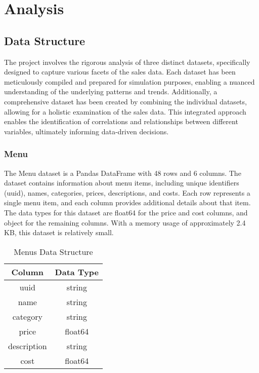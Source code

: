 \section{Analysis}

\subsection{Data Structure}

The project involves the rigorous analysis of three distinct datasets, specifically designed to capture various facets of the sales data. Each dataset has been meticulously compiled and prepared for simulation purposes, enabling a nuanced understanding of the underlying patterns and trends. Additionally, a comprehensive dataset has been created by combining the individual datasets, allowing for a holistic examination of the sales data. This integrated approach enables the identification of correlations and relationships between different variables, ultimately informing data-driven decisions.

\subsubsection{Menu}

The Menu dataset is a Pandas DataFrame with 48 rows and 6 columns. The dataset contains information about menu items, including unique identifiers (uuid), names, categories, prices, descriptions, and costs. Each row represents a single menu item, and each column provides additional details about that item. The data types for this dataset are float64 for the price and cost columns, and object for the remaining columns. With a memory usage of approximately 2.4 KB, this dataset is relatively small.

\begin{table}[H]
	\centering
	\begin{tabular}{cc}
		\toprule
		Column & Data Type \\
		\midrule
		uuid & string \\
		name & string \\
		category & string \\
		price & float64 \\
		description & string \\
		cost & float64 \\
		\bottomrule
	\end{tabular}
	\caption{Menus Data Structure}
	\label{tab:menus_data_structure}
\end{table}

